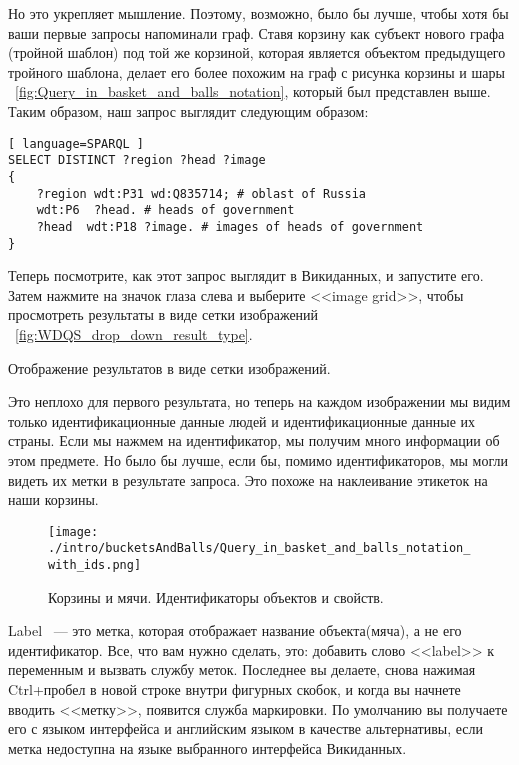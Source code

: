 Но это укрепляет мышление. Поэтому, возможно, было бы лучше, чтобы хотя бы ваши первые запросы напоминали граф. Ставя корзину как субъект нового графа (тройной шаблон) под той же корзиной, которая является объектом предыдущего тройного шаблона, делает его более похожим на граф с рисунка корзины и шары ~\ref{fig:Query_in_basket_and_balls_notation}, который был представлен выше. Таким образом, наш запрос выглядит следующим образом:

\begin{lstlisting}[ language=SPARQL ]
SELECT DISTINCT ?region ?head ?image
{
    ?region wdt:P31 wd:Q835714; # oblast of Russia
    wdt:P6  ?head. # heads of government
    ?head  wdt:P18 ?image. # images of heads of government
}
\end{lstlisting}

Теперь посмотрите, как этот запрос выглядит в Викиданных, и запустите его. Затем нажмите на значок глаза слева и выберите <<image grid>>, чтобы просмотреть результаты в виде сетки изображений ~\ref{fig:WDQS_drop_down_result_type}.

\begin{marginfigure}[-4.5cm]
	{
		\setlength{\fboxsep}{0pt}%
		\setlength{\fboxrule}{1pt}%
	}
    \caption{Отображение результатов в виде сетки изображений.}
	\label{fig:WDQS_drop_down_result_type}
\end{marginfigure}

Это неплохо для первого результата, но теперь на каждом изображении мы видим только идентификационные данные людей и идентификационные данные их страны. Если мы нажмем на идентификатор, мы получим много информации об этом предмете. Но было бы лучше, если бы, помимо идентификаторов, мы могли видеть их метки в результате запроса. Это похоже на наклеивание этикеток на наши корзины. 

\begin{figure*}[h!]
\texttt{[image: ./intro/bucketsAndBalls/Query\_in\_basket\_and\_balls\_notation\_with\_ids.png]}
\caption{Корзины и мячи. Идентификаторы объектов и свойств.}
\label{fig:Query_in_basket_and_balls_notation_with_ids}
\end{figure*}

Label ~--- это метка, которая отображает название объекта(мяча), а не его идентификатор. Все, что вам нужно сделать, это: добавить слово <<label>> к переменным и вызвать службу меток. Последнее вы делаете, снова нажимая Ctrl+пробел в новой строке внутри фигурных скобок, и когда вы начнете вводить <<метку>>, появится служба маркировки. По умолчанию вы получаете его с языком интерфейса и английским языком в качестве альтернативы, если метка недоступна на языке выбранного интерфейса Викиданных.

